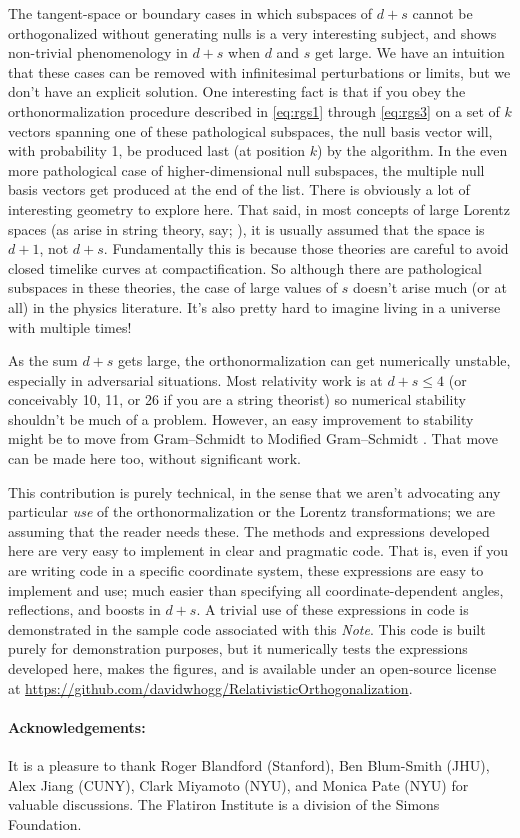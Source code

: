 \documentclass{article}
\newcommand{\plus}{\!+\!} %
\newcommand{\documentname}{\textsl{Note}}
\begin{document}
The tangent-space or boundary cases in which subspaces of $d\plus s$ cannot be orthogonalized without generating nulls is a very interesting subject, and shows non-trivial phenomenology in $d\plus s$ when $d$ and $s$ get large.
We have an intuition that these cases can be removed with infinitesimal perturbations or limits, but we don't have an explicit solution.
One interesting fact is that if you obey the orthonormalization procedure described in \eqref{eq:rgs1} through \eqref{eq:rgs3} on a set of $k$ vectors spanning one of these pathological subspaces, the null basis vector will, with probability 1, be produced last (at position $k$) by the algorithm.
In the even more pathological case of higher-dimensional null subspaces, the multiple null basis vectors get produced at the end of the list.
There is obviously a lot of interesting geometry to explore here.
That said, in most concepts of large Lorentz spaces (as arise in string theory, say; \cite{strings}), it is usually assumed that the space is $d+1$, not $d+s$.
Fundamentally this is because those theories are careful to avoid closed timelike curves at compactification.
So although there are pathological subspaces in these theories, the case of large values of $s$ doesn't arise much (or at all) in the physics literature.
It's also pretty hard to imagine living in a universe with multiple times!

As the sum $d+s$ gets large, the orthonormalization can get numerically unstable, especially in adversarial situations.
Most relativity work is at $d+s\leq 4$ (or conceivably 10, 11, or 26 if you are a string theorist) so numerical stability shouldn't be much of a problem.
However, an easy improvement to stability might be to move from Gram--Schmidt to Modified Gram--Schmidt \cite{modifiedgramschmidt}.
That move can be made here too, without significant work.

This contribution is purely technical, in the sense that we aren't advocating any particular \emph{use} of the orthonormalization or the Lorentz transformations; we are assuming that the reader needs these.
The methods and expressions developed here are very easy to implement in clear and pragmatic code.
That is, even if you are writing code in a specific coordinate system, these expressions are easy to implement and use; much easier than specifying all coordinate-dependent angles, reflections, and boosts in $d\plus s$.
A trivial use of these expressions in code is demonstrated in the sample code associated with this \documentname.
This code is built purely for demonstration purposes, but it numerically tests the expressions developed here, makes the figures, and is available under an open-source license at \url{https://github.com/davidwhogg/RelativisticOrthogonalization}.

\paragraph{Acknowledgements:}
It is a pleasure to thank
  Roger Blandford (Stanford),
  Ben Blum-Smith (JHU),
  Alex Jiang (CUNY),
  Clark Miyamoto (NYU), and
  Monica Pate (NYU)
for valuable discussions.
The Flatiron Institute is a division of the Simons Foundation.

\raggedright


\end{document}
